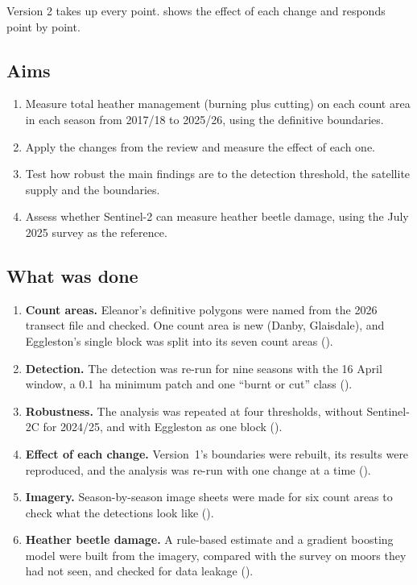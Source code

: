 \documentclass[11pt,a4paper]{article}
\begin{document}
Version 2 takes up every point.  shows the effect of each change and responds point by point.

\subsection{Aims}

\begin{enumerate}
\item Measure total heather management (burning plus cutting) on each count area in each season from 2017/18 to 2025/26, using the definitive boundaries.
\item Apply the changes from the review and measure the effect of each one.
\item Test how robust the main findings are to the detection threshold, the satellite supply and the boundaries.
\item Assess whether Sentinel-2 can measure heather beetle damage, using the July 2025 survey as the reference.
\end{enumerate}

\subsection{What was done}

\begin{enumerate}
\item \textbf{Count areas.} Eleanor's definitive polygons were named from the 2026 transect file and checked. One count area is new (Danby, Glaisdale), and Eggleston's single block was split into its seven count areas ().
\item \textbf{Detection.} The detection was re-run for nine seasons with the 16 April window, a 0.1~ha minimum patch and one ``burnt or cut'' class ().
\item \textbf{Robustness.} The analysis was repeated at four thresholds, without Sentinel-2C for 2024/25, and with Eggleston as one block ().
\item \textbf{Effect of each change.} Version~1's boundaries were rebuilt, its results were reproduced, and the analysis was re-run with one change at a time ().
\item \textbf{Imagery.} Season-by-season image sheets were made for six count areas to check what the detections look like ().
\item \textbf{Heather beetle damage.} A rule-based estimate and a gradient boosting model were built from the imagery, compared with the survey on moors they had not seen, and checked for data leakage ().
\end{enumerate}
\end{document}
